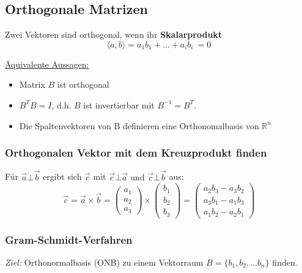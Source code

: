 \subsection{Orthogonale Matrizen}

Zwei Vektoren sind orthogonal, wenn ihr \textbf{Skalarprodukt}\\ 
\begin{equation*}
    \langle a, b \rangle = a_1 b_1 + \hdots + a_i b_i\ = 0
\end{equation*}

\underline{Äquivalente Aussagen:}
\begin{itemize}
    \item Matrix \(B\) ist orthogonal
    \item \(B^T B = I\), d.h. \(B\) ist invertierbar mit \(B^{-1}=B^T\).
    \item Die Spaltenvektoren von B definieren eine Orthonomalbasis von \(\mathbb{R}^n\)\\
\end{itemize}

\subsubsection{Orthogonalen Vektor mit dem Kreuzprodukt finden}
Für \(\vec{a} \bot \vec{b}\) ergibt sich \(\vec{c}\) mit \(\vec{c} \bot \vec{a}\text{ und }\vec{c} \bot \vec{b}\) aus:
\begin{equation*}
    \vec{c} = 
    \vec{a} \times \vec{b} = \begin{pmatrix}
        a_1 \\
        a_2 \\
        a_3
    \end{pmatrix} \times
    \begin{pmatrix}
        b_1 \\
        b_2 \\
        b_3
    \end{pmatrix} =
    \begin{pmatrix}
        a_2 b_3 - a_3 b_2 \\
        a_3 b_1 - a_1 b_3 \\
        a_1 b_2 - a_2 b_1
    \end{pmatrix}
\end{equation*}

\subsubsection{Gram-Schmidt-Verfahren}
\textit{Ziel:} Orthonormalbasis (ONB) zu einem Vektorraum \(B=\{b_1, b_2, \hdots b_n\}\) finden.


